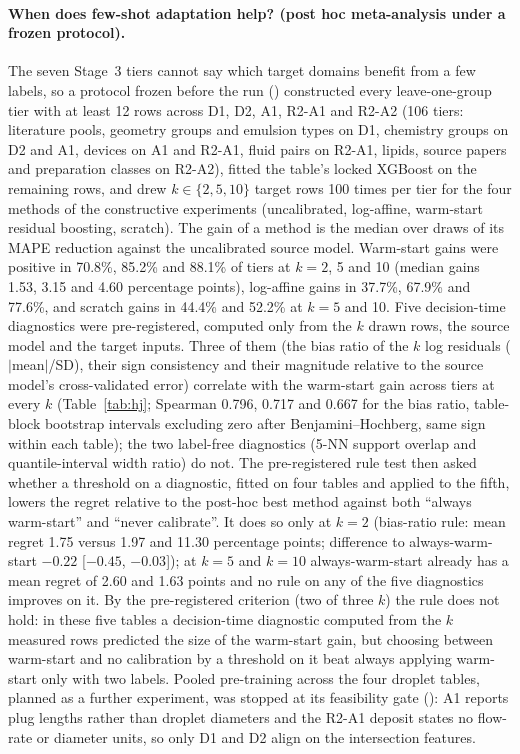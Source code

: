\documentclass[11pt,a4paper]{article}
\begin{document}
\paragraph{When does few-shot adaptation help? (post hoc meta-analysis under a frozen protocol).}
The seven Stage~3 tiers cannot say which target domains benefit from a few
labels, so a protocol frozen before the run
() constructed
every leave-one-group tier with at least 12 rows across D1, D2, A1, R2-A1 and
R2-A2 (106 tiers: literature pools, geometry groups and emulsion types on
D1, chemistry groups on D2 and A1, devices on A1 and R2-A1, fluid pairs on
R2-A1, lipids, source papers and preparation classes on R2-A2), fitted the
table's locked XGBoost on the remaining rows, and drew $k\in\{2,5,10\}$
target rows 100 times per tier for the four methods of the constructive
experiments (uncalibrated, log-affine, warm-start residual boosting,
scratch). The gain of a method is the median over draws of its MAPE
reduction against the uncalibrated source model. Warm-start gains were
positive in 70.8\%, 85.2\% and 88.1\% of tiers at $k=2$, 5 and 10 (median
gains 1.53, 3.15 and 4.60 percentage points), log-affine gains in 37.7\%,
67.9\% and 77.6\%, and scratch gains in 44.4\% and 52.2\% at $k=5$ and 10.
Five decision-time diagnostics were pre-registered, computed only from the
$k$ drawn rows, the source model and the target inputs. Three of them (the
bias ratio of the $k$ log residuals ($|$mean$|$/SD), their sign consistency
and their magnitude relative to the source model's cross-validated error)
correlate with the warm-start gain across tiers at every $k$
(Table~\ref{tab:hj}; Spearman 0.796, 0.717 and 0.667 for the bias ratio,
table-block bootstrap intervals excluding zero after Benjamini--Hochberg,
same sign within each table); the two label-free diagnostics (5-NN support
overlap and quantile-interval width ratio) do not. The pre-registered rule
test then asked whether a threshold on a diagnostic, fitted on four tables
and applied to the fifth, lowers the regret relative to the post-hoc best
method against both ``always warm-start'' and ``never calibrate''. It does so
only at $k=2$ (bias-ratio rule: mean regret 1.75 versus 1.97 and 11.30
percentage points; difference to always-warm-start $-0.22$ [$-0.45$,
$-0.03$]); at $k=5$ and $k=10$ always-warm-start already has a mean regret
of 2.60 and 1.63 points and no rule on any of the five diagnostics improves
on it. By the pre-registered
criterion (two of three $k$) the rule does not hold: in these five tables a
decision-time diagnostic computed from the $k$ measured rows predicted the
size of the warm-start gain, but choosing between warm-start and no
calibration by a threshold on it beat always applying warm-start only with
two labels. Pooled pre-training across the four droplet tables, planned as a
further experiment, was stopped at its feasibility gate
(): A1 reports
plug lengths rather than droplet diameters and the R2-A1 deposit states no
flow-rate or diameter units, so only D1 and D2 align on the intersection
features.
\end{document}
